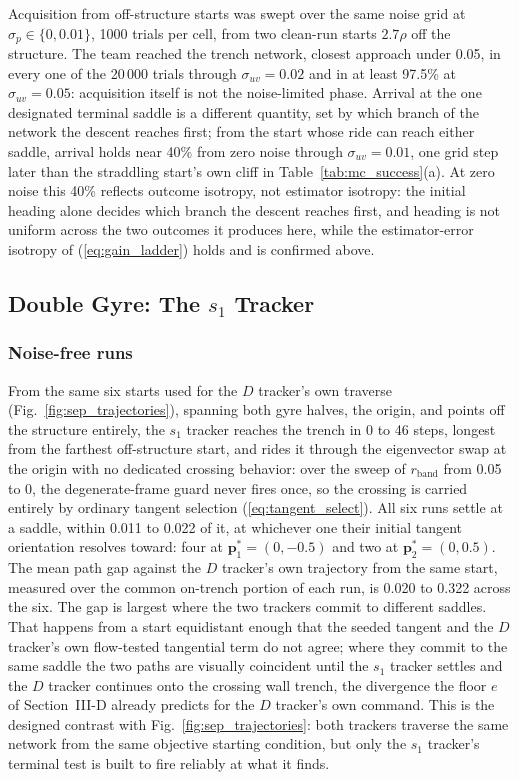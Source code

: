 \documentclass[lettersize,journal]{IEEEtran}
\begin{document}
Acquisition from off-structure starts was swept over the same noise
grid at $\sigma_p \in \{0, 0.01\}$, 1000 trials per cell, from two
clean-run starts $2.7\rho$ off the structure. The team reached the
trench network, closest approach under 0.05, in every one of the
20\,000 trials through $\sigma_{uv} = 0.02$ and in at least 97.5\% at
$\sigma_{uv} = 0.05$: acquisition itself is not the noise-limited
phase. Arrival at the one designated terminal saddle is a different
quantity, set by which branch of the network the descent reaches first;
from the start whose ride can reach either saddle, arrival holds near
40\% from zero noise through $\sigma_{uv} = 0.01$, one grid step later
than the straddling start's own cliff in Table~\ref{tab:mc_success}(a).
At zero noise this 40\% reflects outcome isotropy, not estimator
isotropy: the initial heading alone decides which branch the descent
reaches first, and heading is not uniform across the two outcomes it
produces here, while the estimator-error isotropy of (\ref{eq:gain_ladder})
holds and is confirmed above.

\subsection{Double Gyre: The $s_1$ Tracker}
\label{sec:results_oecs}

\subsubsection{Noise-free runs}
From the same six starts used for the $D$ tracker's own traverse
(Fig.~\ref{fig:sep_trajectories}), spanning both gyre halves, the
origin, and points off the structure entirely, the $s_1$ tracker reaches
the trench in 0 to 46 steps, longest from the farthest off-structure
start, and rides it through the eigenvector swap at the origin with no
dedicated crossing behavior: over the sweep of $r_{\text{band}}$ from
0.05 to 0, the degenerate-frame
guard never fires once, so the
crossing is carried entirely by ordinary tangent selection
(\ref{eq:tangent_select}). All six runs settle at a saddle, within
0.011 to 0.022 of it, at whichever one their initial tangent
orientation resolves toward: four at $\mathbf{p}^*_1 = (0, -0.5)$ and
two at $\mathbf{p}^*_2 = (0, 0.5)$. The mean
path gap against the $D$ tracker's own trajectory from the same start,
measured over the common on-trench portion of each run, is 0.020 to
0.322 across the six. The gap is largest where the two trackers commit
to different saddles. That happens from a start equidistant enough that
the seeded tangent and the $D$ tracker's own flow-tested tangential term
do not agree; where they commit to the same saddle the two paths are visually
coincident until the $s_1$ tracker settles and the $D$ tracker continues
onto the crossing wall trench, the divergence the floor $e$ of
Section~\mbox{III-D} already predicts for the $D$ tracker's own command. This is the
designed contrast with Fig.~\ref{fig:sep_trajectories}: both trackers
traverse the same network from the same objective starting condition,
but only the $s_1$ tracker's terminal test is built to fire reliably at
what it finds.
\end{document}
